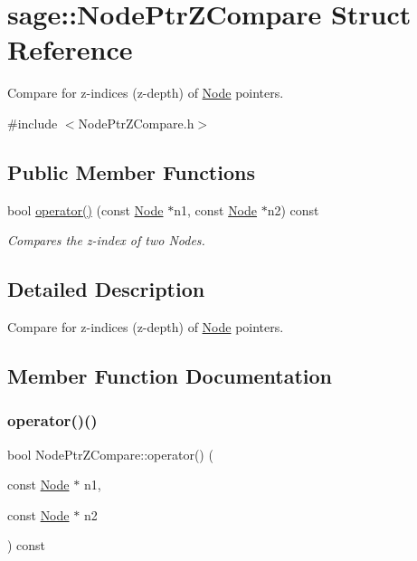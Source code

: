 \hypertarget{structsage_1_1NodePtrZCompare}{}\section{sage\+::Node\+Ptr\+Z\+Compare Struct Reference}
\label{structsage_1_1NodePtrZCompare}


Compare for z-\/indices (z-\/depth) of \mbox{\hyperlink{classsage_1_1Node}{Node}} pointers.  




{\ttfamily \#include $<$Node\+Ptr\+Z\+Compare.\+h$>$}

\subsection*{Public Member Functions}
\begin{DoxyCompactItemize}
\item 
bool \mbox{\hyperlink{structsage_1_1NodePtrZCompare_ae787a8574fedaf8ee6bdec99ad322363}{operator()}} (const \mbox{\hyperlink{classsage_1_1Node}{Node}} $\ast$n1, const \mbox{\hyperlink{classsage_1_1Node}{Node}} $\ast$n2) const
\begin{DoxyCompactList}\small\item\em Compares the z-\/index of two Nodes. \end{DoxyCompactList}\end{DoxyCompactItemize}


\subsection{Detailed Description}
Compare for z-\/indices (z-\/depth) of \mbox{\hyperlink{classsage_1_1Node}{Node}} pointers. 

\subsection{Member Function Documentation}
\mbox{\label{structsage_1_1NodePtrZCompare_ae787a8574fedaf8ee6bdec99ad322363}} 
\subsubsection{\texorpdfstring{operator()()}{operator()()}}
{\footnotesize\ttfamily bool Node\+Ptr\+Z\+Compare\+::operator() (\begin{DoxyParamCaption}\item[{const \mbox{\hyperlink{classsage_1_1Node}{Node}} $\ast$}]{n1,  }\item[{const \mbox{\hyperlink{classsage_1_1Node}{Node}} $\ast$}]{n2 }\end{DoxyParamCaption}) const}



